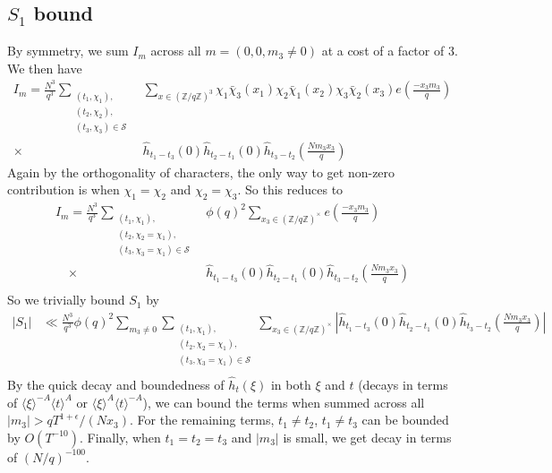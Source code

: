 \subsection{$S_1$ bound}
By symmetry, we sum $I_m$ across all $m=(0,0,m_3\neq 0)$ at a cost of a factor of $3$.
We then have \begin{align*}
    I_m=\frac{N^3}{q^3}\sum_{\substack{(t_1,\chi_1),\\(t_2,\chi_2),\\(t_3,\chi_3)\in\mathcal{S}}} &\sum_{x\in (\mathbb{Z}/q\mathbb{Z})^3}\chi_1\bar{\chi}_3(x_1)\chi_2\bar{\chi}_1(x_2)\chi_3\bar{\chi}_2(x_3) e\left(\frac{-x_3 m_3}{q}\right)\\
    \times \ &\hat{h}_{t_1-t_3}\left(0\right)\hat{h}_{t_2-t_1}\left(0\right)\hat{h}_{t_3-t_2}\left(\frac{Nm_3x_3}{q}\right)
\end{align*}
Again by the orthogonality of characters, the only way to get non-zero contribution is when $\chi_1=\chi_2$ and $\chi_2=\chi_3$. So this reduces to\begin{align*}
    I_m=\frac{N^3}{q^3}\sum_{\substack{(t_1,\chi_1),\\(t_2,\chi_2=\chi_1),\\(t_3,\chi_3=\chi_1)\in\mathcal{S}}} &\phi(q)^2 \sum_{x_3\in (\mathbb{Z}/q\mathbb{Z})^{\times}}e\left(\frac{-x_3 m_3}{q}\right)\\
   \quad  \times \ &\hat{h}_{t_1-t_3}\left(0\right)\hat{h}_{t_2-t_1}\left(0\right)\hat{h}_{t_3-t_2}\left(\frac{Nm_3x_3}{q}\right)\\
\end{align*}
So we trivially bound $S_1$ by\begin{align*}
    |S_1|&\ll  \frac{N^3}{q^3} \phi(q)^2 \sum_{m_3\neq 0}\sum_{\substack{(t_1,\chi_1),\\(t_2,\chi_2=\chi_1),\\(t_3,\chi_3=\chi_1)\in\mathcal{S}}} \sum_{x_3\in (\mathbb{Z}/q\mathbb{Z})^{\times}}
   \left|\hat{h}_{t_1-t_3}\left(0\right)\hat{h}_{t_2-t_1}\left(0\right)\hat{h}_{t_3-t_2}\left(\frac{Nm_3x_3}{q}\right)\right|\\
\end{align*}
By the quick decay and boundedness of $\hat{h}_t(\xi)$ in both $\xi$ and $t$ (decays in terms of $\langle \xi \rangle^{-A}\langle t \rangle^A $ or $ \langle \xi \rangle^A\langle t \rangle^{-A} $), we can bound the terms when summed across all $|m_3|>qT^{1+\epsilon}/(Nx_3)$. For the remaining terms, $t_1\neq t_2$, $t_1\neq t_3$ can be bounded by $O(T^{-10})$.
Finally, when $t_1=t_2=t_3$ and $|m_3|$ is small, we get decay in terms of $(N/q)^{-100}$. 

